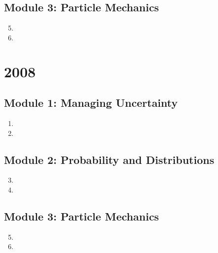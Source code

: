 \documentclass{solutionsmannual}
\begin{document}
\section{Module 3: Particle Mechanics}
\begin{enumerate}[label=\bfseries  \arabic*.]\setcounter{enumi}{4}
\item 
\item 
\end{enumerate}

\chapter{2008}
\section{Module 1: Managing Uncertainty}
\begin{enumerate}[label=\bfseries  \arabic*.]\setcounter{enumi}{0}
\item 
\item 
\end{enumerate}
\section{Module 2: Probability and Distributions}
\begin{enumerate}[label=\bfseries  \arabic*.]\setcounter{enumi}{2}
\item 
\item 
\end{enumerate}
\section{Module 3: Particle Mechanics}
\begin{enumerate}[label=\bfseries  \arabic*.]\setcounter{enumi}{4}
\item 
\item 
\end{enumerate}


\end{document}
